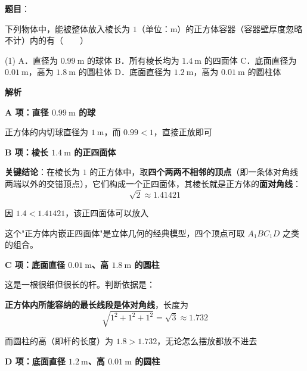 \begin{answer}

\textbf{题目}：

下列物体中，能被整体放入棱长为 $1$（单位：$\mathrm m$）的正方体容器（容器壁厚度忽略不计）内的有\mbox{（　　）}

\begin{gkopts}(1)
\task A．直径为 $0.99\ \mathrm m$ 的球体
\task B．所有棱长均为 $1.4\ \mathrm m$ 的四面体
\task C．底面直径为 $0.01\ \mathrm m$，高为 $1.8\ \mathrm m$ 的圆柱体
\task D．底面直径为 $1.2\ \mathrm m$，高为 $0.01\ \mathrm m$ 的圆柱体
\end{gkopts}

\textbf{解析}

\par\medskip

\textbf{A 项：直径 $0.99\ \mathrm m$ 的球 }

正方体的内切球直径为 $1\ \mathrm m$，而 $0.99<1$，直接正放即可 

\par\medskip

\textbf{B 项：棱长 $1.4\ \mathrm m$ 的正四面体 }

\textbf{关键结论}：在棱长为 $1$ 的正方体中，取\textbf{四个两两不相邻的顶点}（即一条体对角线两端以外的交错顶点），它们构成一个正四面体，其棱长就是正方体的\textbf{面对角线}：
\nopagebreak[4]
\[\sqrt2\approx1.41421\]

因 $1.4<1.41421$，该正四面体可以放入 

\begin{gktip}
这个"正方体内嵌正四面体"是立体几何的经典模型，四个顶点可取 $A_1BC_1D$ 之类的组合。
\end{gktip}

\par\medskip

\textbf{C 项：底面直径 $0.01\ \mathrm m$、高 $1.8\ \mathrm m$ 的圆柱 }

这是一根很细但很长的杆。判断依据是：

\textbf{正方体内所能容纳的最长线段是体对角线}，长度为
\nopagebreak[4]
\[\sqrt{1^{2}+1^{2}+1^{2}}=\sqrt3\approx1.732\]

而圆柱的高（即杆的长度）为 $1.8>1.732$，无论怎么摆放都放不进去 

\par\medskip

\textbf{D 项：底面直径 $1.2\ \mathrm m$、高 $0.01\ \mathrm m$ 的圆柱 }


\end{answer}
